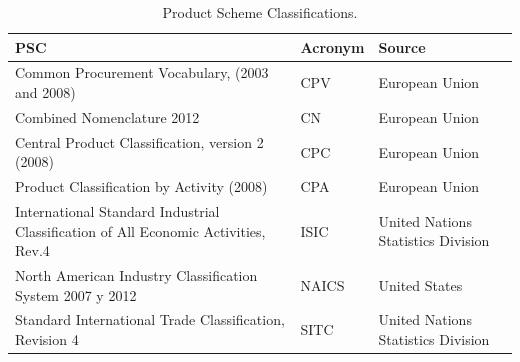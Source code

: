 \begin{table}[!ht]
\renewcommand{\arraystretch}{1.3}
\begin{center}
\begin{tabular}[c]{|p{6cm}|l|p{6cm}|} 
\hline
  \textbf{PSC} &  \textbf{Acronym} & \textbf{Source} \\\hline
  Common Procurement Vocabulary, (2003 and 2008) & CPV & European Union \\ \hline
  Combined Nomenclature 2012 & CN & European Union \\ \hline
  Central Product Classification, version 2 (2008) & CPC & European Union \\ \hline
  Product Classification by Activity (2008) & CPA & European Union \\ \hline
  International Standard Industrial Classification of All Economic Activities, Rev.4 & ISIC & United Nations Statistics Division \\ \hline
  North American Industry Classification System 2007 y 2012 & NAICS & United States \\ \hline
  Standard International Trade Classification, Revision 4 & SITC & United Nations Statistics Division \\ \hline
\hline
\end{tabular}
\caption{Product Scheme Classifications.}\label{table:pscs-ld}
  \end{center}
\end{table} 

